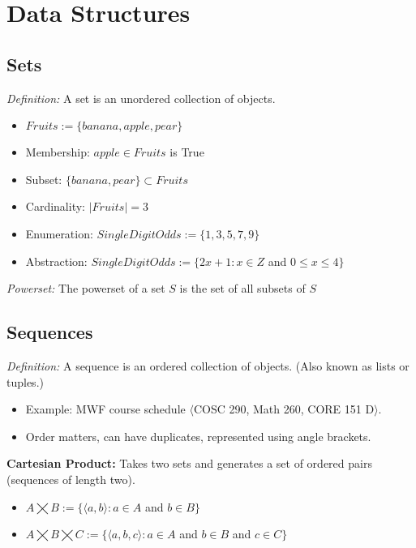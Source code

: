 \documentclass[titlepage]{article}
\begin{document}
 \maketitle

\section{Data Structures}
\label{sec:introduction}

\subsection{Sets}
\emph{Definition: }A set is an unordered collection of objects.
\begin{itemize}
  \item  $Fruits := \{banana, apple, pear\}$
  \item Membership: $apple \in Fruits$ is True
  \item Subset: $\{ banana, pear \} \subset Fruits$
  \item Cardinality: $|Fruits| = 3$
  \item Enumeration: $SingleDigitOdds := \{1, 3, 5, 7, 9\}$
  \item Abstraction: $SingleDigitOdds := \{ 2x + 1 : x \in Z$ and $0 \leq x \leq 4 \}$
\end{itemize}
\emph{Powerset: }The powerset of a set $S$ is the set of all subsets of $S$

\subsection{Sequences}
\emph{Definition: }A sequence is an ordered collection of objects. (Also known as lists
or tuples.)
\begin{itemize}
  \item Example: MWF course schedule $\langle$COSC 290, Math 260, CORE 151 D$\rangle$.
  \item Order matters, can have duplicates, represented using angle brackets.
\end{itemize}
\textbf{Cartesian Product: } Takes two sets and generates a set of ordered pairs (sequences of length two).
\begin{itemize}
  \item $A \bigtimes B := \{ \langle a, b \rangle : a \in A$ and $b \in B \}$
  \item $A \bigtimes B \bigtimes C := \{ \langle a, b, c\rangle : a \in A$ and $b \in B$ and $c \in C \}$
\end{itemize}
\end{document}
